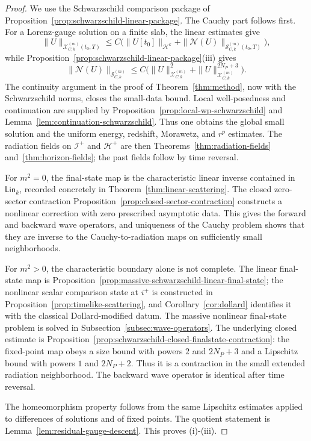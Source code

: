 \documentclass[11pt]{article}
\numberwithin{equation}{section}
\theoremstyle{plain}
\theoremstyle{definition}
\theoremstyle{remark}
\newcommand{\Lin}{\mathsf{Lin}}
\begin{document}
\begin{proof}
We use the Schwarzschild comparison package of Proposition~\ref{prop:schwarzschild-linear-package}.  The Cauchy part follows first.  For a Lorenz-gauge solution on a finite slab, the linear estimates give
\begin{equation}
 \|U\|_{\mathcal X_{C,k}^{(m)}(t_0,T)}
 \le C\bigl(\|U[t_0]\|_{\mathcal H^k}+\|\mathcal N(U)\|_{\mathcal S_{C,k}^{(m)}(t_0,T)}\bigr),
\end{equation}
while Proposition~\ref{prop:schwarzschild-linear-package}(iii) gives
\begin{equation}
 \|\mathcal N(U)\|_{\mathcal S_{C,k}^{(m)}}
 \le C\bigl(\|U\|_{\mathcal X_{C,k}^{(m)}}^2+
 \|U\|_{\mathcal X_{C,k}^{(m)}}^{2N_P+3}\bigr).
\end{equation}
The continuity argument in the proof of Theorem~\ref{thm:method}, now with the Schwarzschild norms, closes the small-data bound.  Local well-posedness and continuation are supplied by Proposition~\ref{prop:local-wp-schwarzschild} and Lemma~\ref{lem:continuation-schwarzschild}.  Thus one obtains the global small solution and the uniform energy, redshift, Morawetz, and $r^p$ estimates.  The radiation fields on $\mathcal I^+$ and $\mathcal H^+$ are then Theorems~\ref{thm:radiation-fields} and~\ref{thm:horizon-fields}; the past fields follow by time reversal.

For $m^2=0$, the final-state map is the characteristic linear inverse contained in $\Lin_k$, recorded concretely in Theorem~\ref{thm:linear-scattering}.  The closed zero-sector contraction Proposition~\ref{prop:closed-sector-contraction} constructs a nonlinear correction with zero prescribed asymptotic data.  This gives the forward and backward wave operators, and uniqueness of the Cauchy problem shows that they are inverse to the Cauchy-to-radiation maps on sufficiently small neighborhoods.

For $m^2>0$, the characteristic boundary alone is not complete.  The linear final-state map is Proposition~\ref{prop:massive-schwarzschild-linear-final-state}; the nonlinear scalar comparison state at $i^+$ is constructed in Proposition~\ref{prop:timelike-scattering}, and Corollary~\ref{cor:dollard} identifies it with the classical Dollard-modified datum.  The massive nonlinear final-state problem is solved in Subsection~\ref{subsec:wave-operators}.  The underlying closed estimate is Proposition~\ref{prop:schwarzschild-closed-finalstate-contraction}: the fixed-point map obeys a size bound with powers $2$ and $2N_P+3$ and a Lipschitz bound with powers $1$ and $2N_P+2$.  Thus it is a contraction in the small extended radiation neighborhood.  The backward wave operator is identical after time reversal.

The homeomorphism property follows from the same Lipschitz estimates applied to differences of solutions and of fixed points.  The quotient statement is Lemma~\ref{lem:residual-gauge-descent}.  This proves (i)-(iii).
\end{proof}
\end{document}
